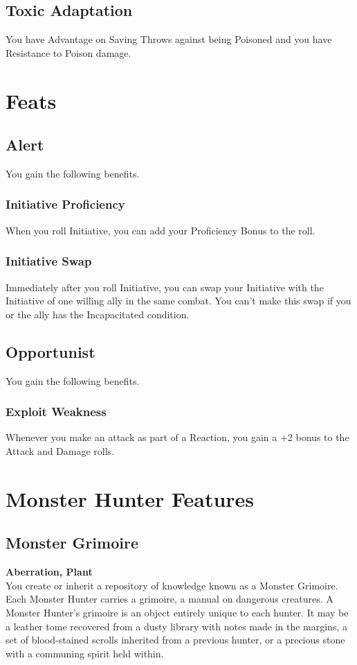 \documentclass[letterpaper,openany,oneside,twocolumn]{book}
\begin{document}
\subsection*{Toxic Adaptation}
You have Advantage on Saving Throws against being Poisoned and you have Resistance to Poison damage.

\section*{Feats}
\subsection*{Alert}
You gain the following benefits.
\subsubsection*{Initiative Proficiency}
When you roll Initiative, you can add your Proficiency Bonus to the roll.
\subsubsection*{Initiative Swap}
Immediately after you roll Initiative, you can swap your Initiative with the Initiative of one willing ally in the same combat. You can't make this swap if you or the ally has the Incapacitated condition.
\subsection*{Opportunist}
You gain the following benefits.
\subsubsection*{Exploit Weakness}
Whenever you make an attack as part of a Reaction, you gain a +2 bonus to the Attack and Damage rolls.


\section*{Monster Hunter Features}
\subsection*{Monster Grimoire}
\textbf{Aberration, Plant}\\
You create or inherit a repository of knowledge known as a Monster Grimoire. Each Monster Hunter carries a grimoire, a manual on dangerous creatures. A Monster Hunter's grimoire is an object entirely unique to each hunter. It may be a leather tome recovered from a dusty library with notes made in the margins, a set of blood-stained scrolls inherited from a previous hunter, or a precious stone with a communing spirit held within.
\end{document}
